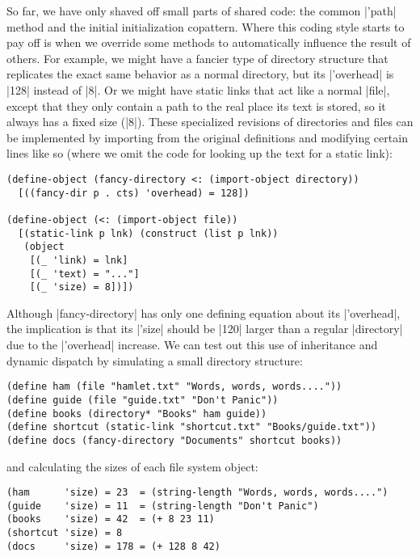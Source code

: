 So far, we have only shaved off small parts of shared code: the common \scm|'path| method and the initial initialization copattern.
Where this coding style starts to pay off is when we override some methods to automatically influence the result of others.
For example, we might have a fancier type of directory structure that replicates the exact same behavior as a normal directory, but its \scm|'overhead| is \scm|128| instead of \scm|8|.
Or we might have static links that act like a normal \scm|file|, except that they only contain a path to the real place its text is stored, so it always has a fixed size (\scm|8|).
These specialized revisions of directories and files can be implemented by importing from the original definitions and modifying certain lines like so (where we omit the code for looking up the text for a static link):
\begin{verbatim}
(define-object (fancy-directory <: (import-object directory))
  [((fancy-dir p . cts) 'overhead) = 128])

(define-object (<: (import-object file))
  [(static-link p lnk) (construct (list p lnk))
   (object
    [(_ 'link) = lnk]
    [(_ 'text) = "..."]
    [(_ 'size) = 8])])
\end{verbatim}
Although \scm|fancy-directory| has only one defining equation about its \scm|'overhead|, the implication is that its \scm|'size| should be \scm|120| larger than a regular \scm|directory| due to the \scm|'overhead| increase.
We can test out this use of inheritance and dynamic dispatch by simulating a small directory structure:
\begin{verbatim}
(define ham (file "hamlet.txt" "Words, words, words...."))
(define guide (file "guide.txt" "Don't Panic"))
(define books (directory* "Books" ham guide))
(define shortcut (static-link "shortcut.txt" "Books/guide.txt"))
(define docs (fancy-directory "Documents" shortcut books))
\end{verbatim}
and calculating the sizes of each file system object:
\begin{verbatim}
(ham      'size) = 23  = (string-length "Words, words, words....")
(guide    'size) = 11  = (string-length "Don't Panic")
(books    'size) = 42  = (+ 8 23 11)
(shortcut 'size) = 8
(docs     'size) = 178 = (+ 128 8 42)
\end{verbatim}


